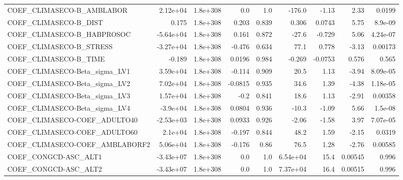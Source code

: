 \begin{tabular}{lrrrrrrrr}
COEF\_CLIMASECO-B\_AMBLABOR         &    2.12e+04 &     1.8e+308 &     0.0 &      1.0 &     -176.0 &       -1.13 &         2.33 &        0.0199 \\
COEF\_CLIMASECO-B\_DIST             &       0.175 &     1.8e+308 &   0.203 &    0.839 &      0.306 &      0.0743 &         5.75 &       8.9e-09 \\
COEF\_CLIMASECO-B\_HABPROSOC        &   -5.64e+04 &     1.8e+308 &   0.161 &    0.872 &      -27.6 &      -0.729 &         5.06 &      4.24e-07 \\
COEF\_CLIMASECO-B\_STRESS           &   -3.27e+04 &     1.8e+308 &  -0.476 &    0.634 &       77.1 &       0.778 &        -3.13 &       0.00173 \\
COEF\_CLIMASECO-B\_TIME             &      -0.189 &     1.8e+308 &  0.0196 &    0.984 &     -0.269 &     -0.0753 &        0.576 &         0.565 \\
COEF\_CLIMASECO-Beta\_sigma\_LV1     &    3.59e+04 &     1.8e+308 &  -0.114 &    0.909 &       20.5 &        1.13 &        -3.94 &      8.09e-05 \\
COEF\_CLIMASECO-Beta\_sigma\_LV2     &    7.02e+04 &     1.8e+308 & -0.0815 &    0.935 &       34.6 &        1.39 &        -4.38 &      1.18e-05 \\
COEF\_CLIMASECO-Beta\_sigma\_LV3     &    1.57e+04 &     1.8e+308 &    -0.2 &    0.841 &       18.6 &        1.13 &        -2.91 &       0.00358 \\
COEF\_CLIMASECO-Beta\_sigma\_LV4     &    -3.9e+04 &     1.8e+308 &  0.0804 &    0.936 &      -10.3 &       -1.09 &         5.66 &       1.5e-08 \\
COEF\_CLIMASECO-COEF\_ADULTO40      &   -2.53e+03 &     1.8e+308 &  0.0933 &    0.926 &      -2.06 &       -1.58 &         3.97 &      7.07e-05 \\
COEF\_CLIMASECO-COEF\_ADULTO60      &     2.1e+04 &     1.8e+308 &  -0.197 &    0.844 &       48.2 &        1.59 &        -2.15 &        0.0319 \\
COEF\_CLIMASECO-COEF\_AMBLABORF2    &    5.06e+04 &     1.8e+308 &  -0.176 &     0.86 &       76.5 &        1.28 &        -2.76 &       0.00585 \\
COEF\_CONGCD-ASC\_ALT1              &   -3.43e+07 &     1.8e+308 &     0.0 &      1.0 &   6.54e+04 &        15.4 &      0.00545 &         0.996 \\
COEF\_CONGCD-ASC\_ALT2              &   -3.43e+07 &     1.8e+308 &     0.0 &      1.0 &   7.37e+04 &        16.4 &      0.00515 &         0.996 \\

\end{tabular}
